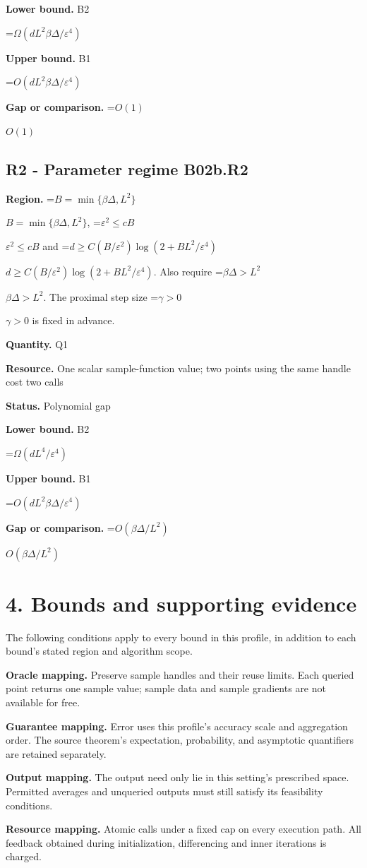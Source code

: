 \documentclass[10pt,a4paper]{article}
\newcommand{\AtlasMath}[1]{\par\begingroup\centering\setbox0=\hbox{$\displaystyle #1$}\ifdim\wd0>1.4\linewidth\typeout{ATLAS WIDE FORMULA: \the\wd0}\fi\ifdim\wd0>\linewidth\resizebox{\linewidth}{!}{\box0}\else\box0\fi\par\endgroup}
\newcommand{\AtlasInlineMath}[1]{\begingroup\setbox0=\hbox{$#1$}\ifdim\wd0>.4\linewidth\endgroup\AtlasMath{#1}\else\endgroup$#1$\fi}
\begin{document}
\textbf{Lower bound.} B2

\AtlasMath{\Omega(dL^2\beta\Delta/\varepsilon^4)}
\textbf{Upper bound.} B1

\AtlasMath{O(dL^2\beta\Delta/\varepsilon^4)}
\textbf{Gap or comparison.} \AtlasInlineMath{O(1)}

\subsection{R2 - Parameter regime B02b.R2}
\textbf{Region.} \AtlasInlineMath{B=\min\{\beta\Delta,L^2\}}, \AtlasInlineMath{\varepsilon^2\le cB} and \AtlasInlineMath{d\ge C(B/\varepsilon^2)\log(2+BL^2/\varepsilon^4)}. Also require \AtlasInlineMath{\beta\Delta>L^2}. The proximal step size \AtlasInlineMath{\gamma>0} is fixed in advance.

\textbf{Quantity.} Q1

\textbf{Resource.} One scalar sample-function value; two points using the same handle cost two calls

\textbf{Status.} Polynomial gap

\textbf{Lower bound.} B2

\AtlasMath{\Omega(dL^4/\varepsilon^4)}
\textbf{Upper bound.} B1

\AtlasMath{O(dL^2\beta\Delta/\varepsilon^4)}
\textbf{Gap or comparison.} \AtlasInlineMath{O(\beta\Delta/L^2)}

\section{4. Bounds and supporting evidence}
The following conditions apply to every bound in this profile, in addition to each bound's stated region and algorithm scope.

\textbf{Oracle mapping.} Preserve sample handles and their reuse limits. Each queried point returns one sample value; sample data and sample gradients are not available for free.

\textbf{Guarantee mapping.} Error uses this profile's accuracy scale and aggregation order. The source theorem's expectation, probability, and asymptotic quantifiers are retained separately.

\textbf{Output mapping.} The output need only lie in this setting's prescribed space. Permitted averages and unqueried outputs must still satisfy its feasibility conditions.

\textbf{Resource mapping.} Atomic calls under a fixed cap on every execution path. All feedback obtained during initialization, differencing and inner iterations is charged.
\end{document}
